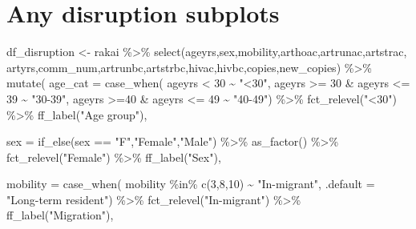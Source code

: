 \documentclass[
  letterpaper,
  DIV=11,
  numbers=noendperiod]{scrartcl}
\newenvironment{Shaded}{\begin{snugshade}}{\end{snugshade}}
\newcommand{\AttributeTok}[1]{\textcolor[rgb]{0.40,0.45,0.13}{#1}}
\newcommand{\DecValTok}[1]{\textcolor[rgb]{0.68,0.00,0.00}{#1}}
\newcommand{\FunctionTok}[1]{\textcolor[rgb]{0.28,0.35,0.67}{#1}}
\newcommand{\NormalTok}[1]{\textcolor[rgb]{0.00,0.23,0.31}{#1}}
\newcommand{\OtherTok}[1]{\textcolor[rgb]{0.00,0.23,0.31}{#1}}
\newcommand{\SpecialCharTok}[1]{\textcolor[rgb]{0.37,0.37,0.37}{#1}}
\newcommand{\StringTok}[1]{\textcolor[rgb]{0.13,0.47,0.30}{#1}}
\begin{document}
\section{Any disruption subplots}\label{any-disruption-subplots}

\begin{Shaded}
\begin{Highlighting}[]
\NormalTok{df\_disruption }\OtherTok{\textless{}{-}}\NormalTok{  rakai }\SpecialCharTok{\%\textgreater{}\%} 
   \FunctionTok{select}\NormalTok{(ageyrs,sex,mobility,arthoac,artrunac,artstrac,}
\NormalTok{    artyrs,comm\_num,artrunbc,artstrbc,hivac,hivbc,copies,new\_copies) }\SpecialCharTok{\%\textgreater{}\%} 
   \FunctionTok{mutate}\NormalTok{(}
     \AttributeTok{age\_cat =} \FunctionTok{case\_when}\NormalTok{(}
\NormalTok{       ageyrs }\SpecialCharTok{\textless{}} \DecValTok{30} \SpecialCharTok{\textasciitilde{}} \StringTok{"\textless{}30"}\NormalTok{,}
\NormalTok{       ageyrs }\SpecialCharTok{\textgreater{}=} \DecValTok{30} \SpecialCharTok{\&}\NormalTok{ ageyrs }\SpecialCharTok{\textless{}=} \DecValTok{39} \SpecialCharTok{\textasciitilde{}}  \StringTok{"30{-}39"}\NormalTok{,}
\NormalTok{       ageyrs }\SpecialCharTok{\textgreater{}=}\DecValTok{40} \SpecialCharTok{\&}\NormalTok{ ageyrs }\SpecialCharTok{\textless{}=} \DecValTok{49} \SpecialCharTok{\textasciitilde{}} \StringTok{"40{-}49"}\NormalTok{) }\SpecialCharTok{\%\textgreater{}\%} 
       \FunctionTok{fct\_relevel}\NormalTok{(}\StringTok{"\textless{}30"}\NormalTok{) }\SpecialCharTok{\%\textgreater{}\%} 
       \FunctionTok{ff\_label}\NormalTok{(}\StringTok{"Age group"}\NormalTok{),}
     
     \AttributeTok{sex =} \FunctionTok{if\_else}\NormalTok{(sex }\SpecialCharTok{==} \StringTok{"F"}\NormalTok{,}\StringTok{"Female"}\NormalTok{,}\StringTok{"Male"}\NormalTok{) }\SpecialCharTok{\%\textgreater{}\%} 
       \FunctionTok{as\_factor}\NormalTok{() }\SpecialCharTok{\%\textgreater{}\%}
       \FunctionTok{fct\_relevel}\NormalTok{(}\StringTok{"Female"}\NormalTok{) }\SpecialCharTok{\%\textgreater{}\%} 
       \FunctionTok{ff\_label}\NormalTok{(}\StringTok{"Sex"}\NormalTok{),}
     
     \AttributeTok{mobility =} \FunctionTok{case\_when}\NormalTok{(}
\NormalTok{       mobility }\SpecialCharTok{\%in\%} \FunctionTok{c}\NormalTok{(}\DecValTok{3}\NormalTok{,}\DecValTok{8}\NormalTok{,}\DecValTok{10}\NormalTok{) }\SpecialCharTok{\textasciitilde{}} \StringTok{"In{-}migrant"}\NormalTok{,}
       \AttributeTok{.default =} \StringTok{"Long{-}term resident"}\NormalTok{) }\SpecialCharTok{\%\textgreater{}\%} 
       \FunctionTok{fct\_relevel}\NormalTok{(}\StringTok{"In{-}migrant"}\NormalTok{) }\SpecialCharTok{\%\textgreater{}\%} 
       \FunctionTok{ff\_label}\NormalTok{(}\StringTok{"Migration"}\NormalTok{),}
     

\end{Highlighting}
\end{Shaded}
\end{document}
